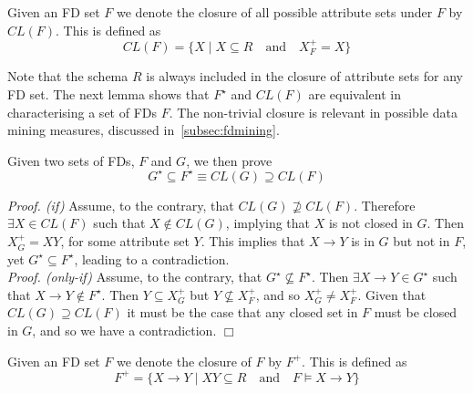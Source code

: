 \begin{definition}
\begin{rm}
Given an FD set $F$ we denote the closure of all possible
attribute sets under $F$ by $CL(F)$. This is defined as
\begin{displaymath}
CL(F) = \{X \mid X \subseteq R \quad\mbox{and}\quad X_F^+ = X \}
\end{displaymath}
\end{rm}
\end{definition}

Note that the schema $R$ is always included in the closure of attribute
sets for any FD set. The next lemma shows that $F^\star$ and 
$CL(F)$ are equivalent in characterising a set of FDs $F$. The
non-trivial closure is relevant in possible data mining measures,
discussed in~\ref{subsec:fdmining}.

\begin{lemma}
\begin{rm}
Given two sets of FDs, $F$ and $G$, we then prove 
\begin{equation}\label{eq:pr1}
G^\star \subseteq F^\star \equiv CL(G) \supseteq CL(F)
\end{equation}
\end{rm}
\end{lemma}

{\em Proof. (if) }
Assume, to the contrary, that $CL(G) \not\supseteq CL(F)$.
Therefore $\exists X \in CL(F)$ such that $X \not\in CL(G)$, implying
that $X$ is not closed in $G$. 
Then $X_G^+ = XY$, for some attribute set $Y$.
 This implies that $X \to Y$ is in $G$ but
not in $F$, yet $G^\star \subseteq F^\star$, leading to a contradiction.\\

{\em Proof. (only-if) }
Assume, to the contrary, that $G^\star \not\subseteq F^\star$. 
Then $\exists X \to Y \in G^\star$ such that $X \to Y \not\in F^\star$.
Then $Y \subseteq X_G^+$ but $Y \not\subseteq X_F^+$, 
and so $X^+_G \not= X^+_F$.
Given that $CL(G) \supseteq CL(F)$ it must be the case that 
any closed set in $F$
must be closed in $G$, and so we have a contradiction. $\Box$\\



\begin{definition}
\begin{rm}
Given an FD set $F$ we denote the closure of $F$ by $F^+$. 
This is defined as
\begin{displaymath}
F^+ = \{X \to Y \mid XY \subseteq R \quad\mbox{and}\quad F \models X
\to Y  \}
\end{displaymath}
\end{rm}
\end{definition}


